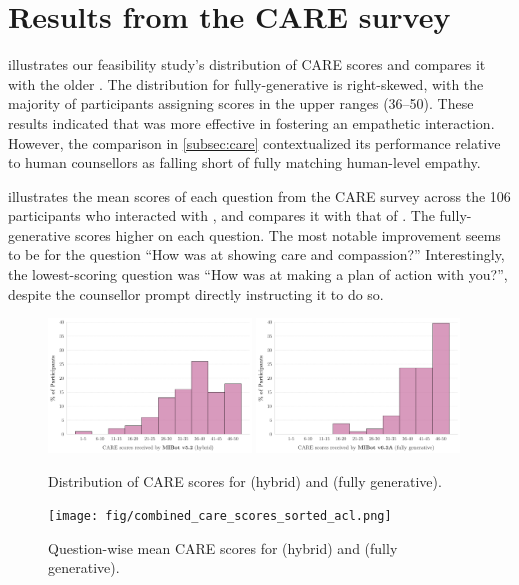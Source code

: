\section{Results from the CARE survey}
\label{appendix:CAREdist}

 illustrates our feasibility study's distribution of CARE scores and compares it with the older \oldsysname \citep{brown2023mi}. The distribution for fully-generative \sysnamewithv is right-skewed, with the majority of participants assigning scores in the upper ranges (36–50). These results indicated that \sysname was more effective in fostering an empathetic interaction. However, the comparison in \cref{subsec:care} contextualized its performance relative to human counsellors as falling short of fully matching human-level empathy.

 illustrates the mean scores of each question from the CARE survey across the 106 participants who interacted with \sysnamewithv, and compares it with that of \oldsysname. The fully-generative \sysnamewithv scores higher on each question. The most notable improvement seems to be for the question ``How was \sysname at showing care and compassion?''
Interestingly, the lowest-scoring question was ``How was \sysname at making a plan of action with you?'', despite the counsellor prompt directly instructing it to do so.


\begin{figure}[H]
\centering
  \includegraphics[width=0.48\textwidth]{fig/MIV5.2_care_scores_histogram.png} \hfill
  \includegraphics[width=0.48\textwidth]{fig/2024-11-14-MIV6.3A-2024-11-22-MIV6.3A_care_scores_histogram.png}
  \caption {Distribution of CARE scores for \oldsysname (hybrid) and \sysnamewithv (fully generative).}
  \label{fig:caredist}
\end{figure}



\vspace{-0.5cm}

\begin{figure}[!htbp]
\centering
  \texttt{[image: fig/combined\_care\_scores\_sorted\_acl.png]}
  \caption {Question-wise mean CARE scores for \oldsysname (hybrid) and \sysnamewithv (fully generative).}
  \label{fig:caremean}
\end{figure}

